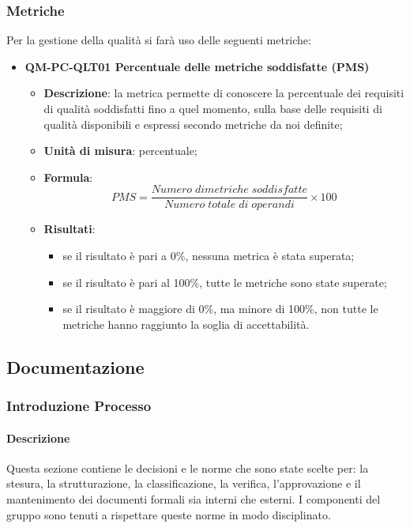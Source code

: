 		\subsubsection{Metriche}
			Per la gestione della qualità si farà uso delle seguenti metriche:
			\begin{itemize}
				\item\textbf{QM-PC-QLT01 Percentuale delle metriche soddisfatte (PMS)}
					\begin{itemize}
						\item\textbf{Descrizione}: la metrica permette di conoscere la percentuale dei requisiti di qualità soddisfatti fino a quel momento, sulla base delle requisiti di qualità disponibili e espressi secondo metriche da noi definite;
						\item\textbf{Unità di misura}: percentuale;
						\item\textbf{Formula}: \\
							\[PMS = \frac{\mathit{Numero\;di metriche\;soddisfatte}}{\mathit{Numero\;totale\;di\;operandi}} \times 100\]
						\item\textbf{Risultati}: 
							\begin{itemize}
								\item se il risultato è pari a 0\%, nessuna metrica è stata superata;
								\item se il risultato è pari al 100\%, tutte le metriche sono state superate;
								\item se il risultato è maggiore di 0\%, ma minore di 100\%, non tutte le metriche hanno raggiunto la soglia di accettabilità.
							\end{itemize}
					\end{itemize}
			\end{itemize}
	
	\subsection{Documentazione}
		\subsubsection{Introduzione Processo}
			\paragraph{Descrizione}
				Questa sezione contiene le decisioni e le norme che sono state scelte per: la stesura, la strutturazione, la classificazione, la verifica, l’approvazione e il mantenimento dei documenti formali sia interni che esterni. I componenti del gruppo sono tenuti a rispettare queste norme in modo disciplinato.
